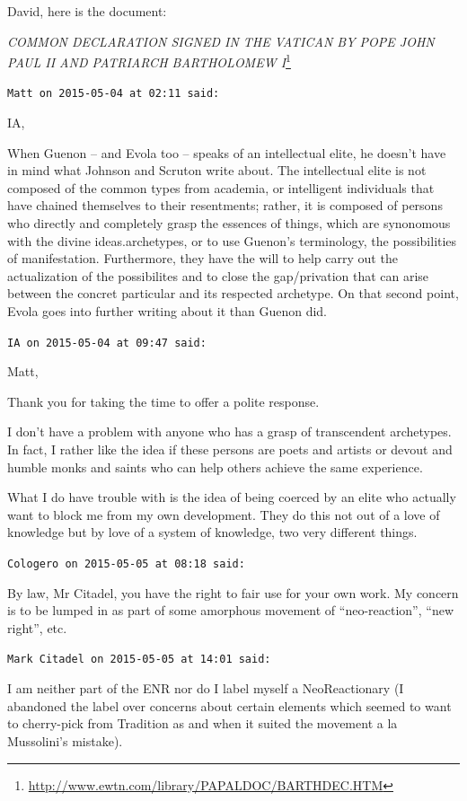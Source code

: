 \begin{footnotesize}
\begin{sffamily}
David, here is the document:

\textit{COMMON DECLARATION SIGNED IN THE VATICAN BY POPE JOHN PAUL II AND PATRIARCH BARTHOLOMEW I}\footnote{\url{http://www.ewtn.com/library/PAPALDOC/BARTHDEC.HTM}}

\hfill

\texttt{Matt on 2015-05-04 at 02:11 said:}

IA,

When Guenon -- and Evola too -- speaks of an intellectual elite, he doesn't have in mind what Johnson and Scruton write about. The intellectual elite is not composed of the common types from academia, or intelligent individuals that have chained themselves to their resentments; rather, it is composed of persons who directly and completely grasp the essences of things, which are synonomous with the divine ideas.archetypes, or to use Guenon's terminology, the possibilities of manifestation. Furthermore, they have the will to help carry out the actualization of the possibilites and to close the gap/privation that can arise between the concret particular and its respected archetype. On that second point, Evola goes into further writing about it than Guenon did.

\hfill

\texttt{IA on 2015-05-04 at 09:47 said:}

Matt,

Thank you for taking the time to offer a polite response.

I don't have a problem with anyone who has a grasp of transcendent archetypes. In fact, I rather like the idea if these persons are poets and artists or devout and humble monks and saints who can help others achieve the same experience.

What I do have trouble with is the idea of being coerced by an elite who actually want to block me from my own development. They do this not out of a love of knowledge but by love of a system of knowledge, two very different things.

\hfill

\texttt{Cologero on 2015-05-05 at 08:18 said:}

By law, Mr Citadel, you have the right to fair use for your own work. My concern is to be lumped in as part of some amorphous movement of ``neo-reaction'', ``new right'', etc.

\hfill

\texttt{Mark Citadel on 2015-05-05 at 14:01 said:}

I am neither part of the ENR nor do I label myself a NeoReactionary (I abandoned the label over concerns about certain elements which seemed to want to cherry-pick from Tradition as and when it suited the movement a la Mussolini's mistake).


\end{sffamily}
\end{footnotesize}
